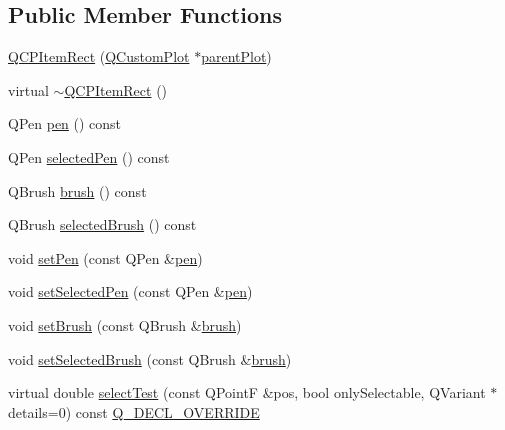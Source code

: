 \subsection*{Public Member Functions}
\begin{DoxyCompactItemize}
\item 
\mbox{\hyperlink{class_q_c_p_item_rect_a412ad1579f7a1fba453d0fa28c496cbc}{Q\+C\+P\+Item\+Rect}} (\mbox{\hyperlink{class_q_custom_plot}{Q\+Custom\+Plot}} $\ast$\mbox{\hyperlink{class_q_c_p_layerable_a473edb813a4c1929d6b6a8fe3ff3faf7}{parent\+Plot}})
\item 
virtual \mbox{\hyperlink{class_q_c_p_item_rect_af9e89f80457afc2d0fd2c6527b40a5f2}{$\sim$\+Q\+C\+P\+Item\+Rect}} ()
\item 
Q\+Pen \mbox{\hyperlink{class_q_c_p_item_rect_a3ee2f580a3950dc11247f405ce8b6ecf}{pen}} () const
\item 
Q\+Pen \mbox{\hyperlink{class_q_c_p_item_rect_abd93cf93404ce827dfae71d9d9d08b29}{selected\+Pen}} () const
\item 
Q\+Brush \mbox{\hyperlink{class_q_c_p_item_rect_a5071d7fd864428a1398152aca87b54ad}{brush}} () const
\item 
Q\+Brush \mbox{\hyperlink{class_q_c_p_item_rect_a2b0a6852bc92d716c7e811c90de2c1a9}{selected\+Brush}} () const
\item 
void \mbox{\hyperlink{class_q_c_p_item_rect_a483c0da5a17e1646cd17ddea2c124e7d}{set\+Pen}} (const Q\+Pen \&\mbox{\hyperlink{class_q_c_p_item_rect_a3ee2f580a3950dc11247f405ce8b6ecf}{pen}})
\item 
void \mbox{\hyperlink{class_q_c_p_item_rect_a52a1bcb2dc753a538e406a2ba3cf21ce}{set\+Selected\+Pen}} (const Q\+Pen \&\mbox{\hyperlink{class_q_c_p_item_rect_a3ee2f580a3950dc11247f405ce8b6ecf}{pen}})
\item 
void \mbox{\hyperlink{class_q_c_p_item_rect_abbd4e346a03513ee466afc25d9c75446}{set\+Brush}} (const Q\+Brush \&\mbox{\hyperlink{class_q_c_p_item_rect_a5071d7fd864428a1398152aca87b54ad}{brush}})
\item 
void \mbox{\hyperlink{class_q_c_p_item_rect_abd1792859844118dedee86223cede7af}{set\+Selected\+Brush}} (const Q\+Brush \&\mbox{\hyperlink{class_q_c_p_item_rect_a5071d7fd864428a1398152aca87b54ad}{brush}})
\item 
virtual double \mbox{\hyperlink{class_q_c_p_item_rect_a2e68621b75bae4da6ae0ab2cdd0dd733}{select\+Test}} (const Q\+PointF \&pos, bool only\+Selectable, Q\+Variant $\ast$details=0) const \mbox{\hyperlink{qcustomplot_8h_a42cc5eaeb25b85f8b52d2a4b94c56f55}{Q\+\_\+\+D\+E\+C\+L\+\_\+\+O\+V\+E\+R\+R\+I\+DE}}
\end{DoxyCompactItemize}
